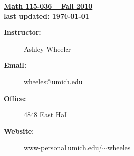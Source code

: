 \documentclass[11pt,twoside]{article}
\begin{document}
\begin{center}
{\bf \Large \underline{Math 115-036 -- Fall 2010} \\
last updated: \today}
\end{center}

\vspace{.05in}

\begin{description}
\item[\bf Instructor:] Ashley Wheeler

\item[\bf Email:]  wheeles@umich.edu

\item[\bf Office:] 4848 East Hall

\item[\bf Website:] www-personal.umich.edu/$\sim $wheeles
\end{description}
\end{document}
